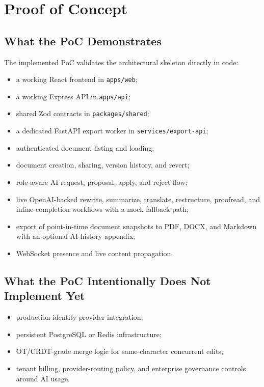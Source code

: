 \section{Proof of Concept}

\subsection{What the PoC Demonstrates}

The implemented PoC validates the architectural skeleton directly in code:

\begin{itemize}[leftmargin=1.3em]
    \item a working React frontend in \texttt{apps/web};
    \item a working Express API in \texttt{apps/api};
    \item shared Zod contracts in \texttt{packages/shared};
    \item a dedicated FastAPI export worker in \texttt{services/export-api};
    \item authenticated document listing and loading;
    \item document creation, sharing, version history, and revert;
    \item role-aware AI request, proposal, apply, and reject flow;
    \item live OpenAI-backed rewrite, summarize, translate, restructure, proofread, and inline-completion workflows with a mock fallback path;
    \item export of point-in-time document snapshots to PDF, DOCX, and Markdown with an optional AI-history appendix;
    \item WebSocket presence and live content propagation.
\end{itemize}

\subsection{What the PoC Intentionally Does Not Implement Yet}

\begin{itemize}[leftmargin=1.3em]
    \item production identity-provider integration;
    \item persistent PostgreSQL or Redis infrastructure;
    \item OT/CRDT-grade merge logic for same-character concurrent edits;
    \item tenant billing, provider-routing policy, and enterprise governance controls around AI usage.
\end{itemize}

